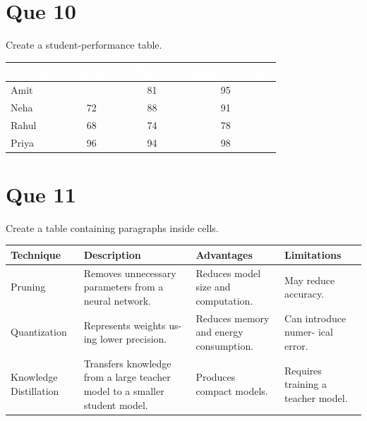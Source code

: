 \documentclass{article}
\begin{document}
	\section*{Que 10}
	Create a student-performance table.
	\begin{center}
		\begin{tabular}{|l|c|c|c|}
			\hline
			\rowcolor{blue}
			\textbf{\textcolor{white}{Student}} & 
			\textbf{\textcolor{white}{Mathematics}} & 
			\textbf{\textcolor{white}{Physics}} & 
			\textbf{\textcolor{white}{Computer Science}} \\
			\hline
			Amit & \cellcolor{green}{92} &  \cellcolor{yellow} 81 &  \cellcolor{green} 95 \\
			\hline
			Neha & \cellcolor{red} 72 &  \cellcolor{yellow} 88 &  \cellcolor{green} 91 \\
			\hline
			Rahul & \cellcolor{red} 68 &  \cellcolor{yellow} 74 &  \cellcolor{red} 78 \\
			\hline
			Priya & \cellcolor{green} 96 &  \cellcolor{green} 94 &  \cellcolor{green} 98 \\
			\hline
		\end{tabular}
	\end{center}
	
	
	\section*{Que 11}
    Create a table containing paragraphs inside cells.
	\begin{center}
		\begin{tabular}{|p{2.7cm}|p{2.7cm}|p{2.7cm}|p{2.7cm}|}
			\hline
			\textbf{Technique} & \textbf{Description} & \textbf{Advantages} &  \textbf{Limitations} \\
			\hline
			
			Pruning & Removes unnecessary
			parameters from a
			neural network. & Reduces model size
			and computation. & May reduce accuracy. \\ 
			\hline
			Quantization & Represents weights us-
			ing lower precision. & Reduces memory and
			energy consumption. & Can introduce numer-
			ical error.\\ 
			\hline
			Knowledge Distillation & Transfers knowledge
			from a large teacher
			model to a smaller
			student model. & Produces compact
			models.& Requires training a
			teacher model.\\ 
			\hline
		\end{tabular}
	\end{center}
	
\end{document}
